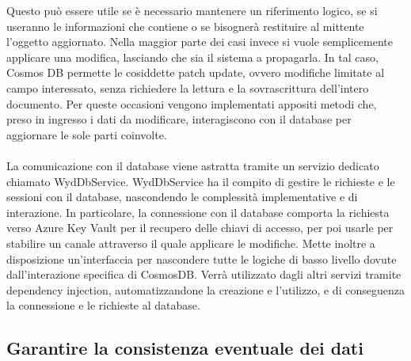 Questo può essere utile se è necessario mantenere un riferimento logico,
se si useranno le informazioni che contiene
o se bisognerà restituire al mittente l'oggetto aggiornato.
Nella maggior parte dei casi invece si vuole semplicemente applicare una modifica,
lasciando che sia il sistema a propagarla.
In tal caso, Cosmos DB permette le cosiddette patch update, 
ovvero modifiche limitate al campo interessato,
senza richiedere la lettura e la sovrascrittura dell'intero documento.
Per queste occasioni vengono implementati appositi metodi che, 
preso in ingresso i dati da modificare, 
interagiscono con il database per aggiornare le sole parti coinvolte.\\
\\
La comunicazione con il database viene astratta tramite un servizio dedicato chiamato WydDbService.
WydDbService ha il compito di gestire le richieste e le sessioni con il database,
nascondendo le complessità implementative e di interazione.
In particolare, la connessione con il database comporta 
la richiesta verso Azure Key Vault per il recupero delle chiavi di accesso,
per poi usarle per stabilire un canale attraverso il quale applicare le modifiche. 
Mette inoltre a disposizione un'interfaccia per nascondere 
tutte le logiche di basso livello dovute dall'interazione specifica di CosmosDB.
Verrà utilizzato dagli altri servizi tramite dependency injection, 
automatizzandone la creazione e l'utilizzo, e di conseguenza la connessione e le richieste al database. \\

\subsection{Garantire la consistenza eventuale dei dati}


